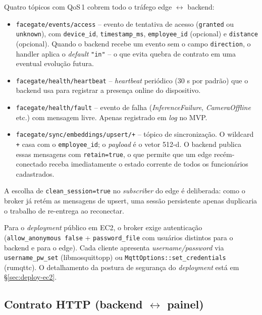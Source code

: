 \documentclass[12pt,a4paper]{report}
\begin{document}
Quatro tópicos com QoS\,1 cobrem todo o tráfego edge $\leftrightarrow$
backend:

\begin{itemize}
    \item \texttt{facegate/events/access} -- evento de tentativa de
        acesso (\texttt{granted} ou \texttt{unknown}), com
        \texttt{device\_id}, \texttt{timestamp\_ms},
        \texttt{employee\_id} (opcional) e \texttt{distance} (opcional).
        Quando o backend recebe um evento sem o campo
        \texttt{direction}, o handler aplica o \textit{default}
        \texttt{"in"} -- o que evita quebra de contrato em uma
        eventual evolução futura.
    \item \texttt{facegate/health/heartbeat} -- \textit{heartbeat}
        periódico (30 s por padrão) que o backend usa para registrar
        a presença online do dispositivo.
    \item \texttt{facegate/health/fault} -- evento de falha
        (\textit{InferenceFailure}, \textit{CameraOffline} etc.) com
        mensagem livre. Apenas registrado em \textit{log} no MVP.
    \item \texttt{facegate/sync/embeddings/upsert/+} -- tópico de
        sincronização. O wildcard \texttt{+} casa com o
        \texttt{employee\_id}; o \textit{payload} é o vetor 512-d. O
        backend publica essas mensagens com \texttt{retain=true}, o
        que permite que um edge recém-conectado receba imediatamente
        o estado corrente de todos os funcionários cadastrados.
\end{itemize}

A escolha de \texttt{clean\_session=true} no \textit{subscriber} do
edge é deliberada: como o broker já retém as mensagens de upsert, uma
sessão persistente apenas duplicaria o trabalho de re-entrega ao
reconectar.

Para o \textit{deployment} público em EC2, o broker exige autenticação
(\texttt{allow\_anonymous false} + \texttt{password\_file} com usuários
distintos para o backend e para o edge). Cada cliente apresenta
\textit{username/password} via \texttt{username\_pw\_set} (libmosquittopp)
ou \texttt{MqttOptions::set\_credentials} (rumqttc). O detalhamento da
postura de segurança do \textit{deployment} está em §\ref{sec:deploy-ec2}.

\subsection{Contrato HTTP (backend $\leftrightarrow$ painel)}
\end{document}
